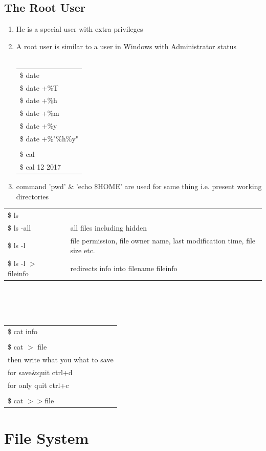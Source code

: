 \documentclass[12pt, a4paper]{report}
\begin{document}
\section{The Root User}
\begin{enumerate}
\item He is a special user with extra privileges
\item A root user is similar to a user in Windows with Administrator status\\
\\
\begin{tabular}{|l|}\hline
\$ date\\
\$ date +\%T \\
\$ date +\%h \\
\$ date +\%m \\
\$ date +\%y \\
\$ date +\%"\%h\%y" \\
\\
\$ cal\\
\$ cal 12 2017\\ \hline 
\end{tabular}
\item command 'pwd' \& 'echo \$HOME' are used for same thing i.e. present working directories\\
\end{enumerate}	
\begin{tabular}{|lcl|}\hline
\$ ls &&\\
\$ ls -all && all files including hidden\\
\$ ls -l && file permission, file owner name, last modification time, file size etc.\\
\$ ls -l $>$ fileinfo && redirects info into filename fileinfo\\ \hline
\end{tabular}\\
\\
\\
\begin{tabular}{|l|}\hline
\$ cat info\\
\\
\$ cat $>$ file\\
then write what you what to save\\
for save\&quit ctrl+d\\
for only quit ctrl+c\\
\\
\$ cat $>>$file \\ \hline
\end{tabular}
%
\chapter{File System}
\end{document}
